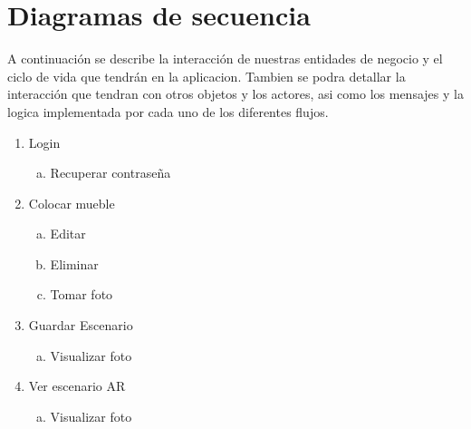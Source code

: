 \section{Diagramas de secuencia}
A continuación se describe la interacción de nuestras entidades de negocio y el ciclo de vida que tendrán en la aplicacion. Tambien se podra detallar la interacción que tendran con otros objetos y los actores, asi como los mensajes y la logica implementada por cada uno de los diferentes flujos.\par

\vspace{5mm}
\begin{enumerate}[1.]
\item Login
	\begin{enumerate}[a)]
	\item Recuperar contraseña 
	\end{enumerate}
\item Colocar mueble
	\begin{enumerate}[a)]
	\item Editar
	\item Eliminar
	\item Tomar foto
	\end{enumerate}
\item Guardar Escenario
	\begin{enumerate}[a)]
	\item Visualizar foto
	\end{enumerate}
\item Ver escenario AR
	\begin{enumerate}[a)]
	\item Visualizar foto
	\end{enumerate}
\end{enumerate}